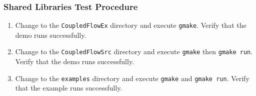 \subsubsection{Shared Libraries Test Procedure}

\begin{enumerate}
\item Change to the {\tt CoupledFlowEx} directory and execute {\tt gmake}. Verify that the demo runs successfully.
\item Change to the {\tt CoupledFlowSrc} directory and execute {\tt gmake} then {\tt gmake run}. Verify that the demo runs successfully.
\item Change to the {\tt examples} directory and execute {\tt gmake} and {\tt gmake run}. Verify that the example runs successfully.
\end{enumerate}














